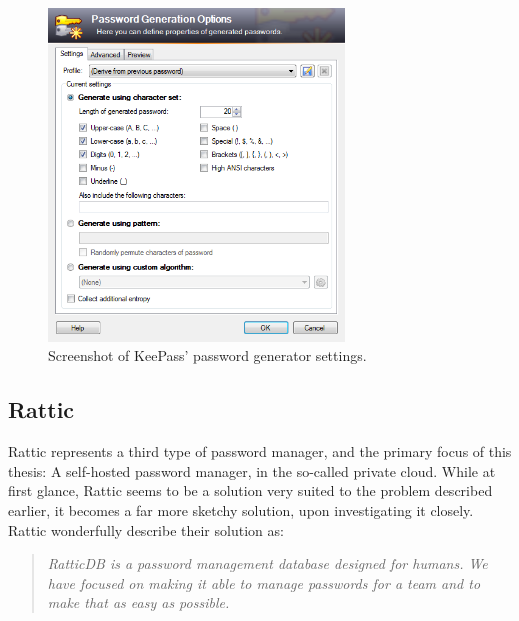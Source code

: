 
			\begin{figure}[h!]
				\centering
				\includegraphics[width=0.7\textwidth]{figures/analysis/keepass_newpassword_passwordgen.png}
				\caption{Screenshot of KeePass' password generator settings.}
				\label{fig:keepass_newpassword_passwordgen}
			\end{figure}

		\subsection*{Rattic}
			Rattic\cite{rattic_frontpage} represents a third type of password manager, and the primary focus of this thesis: A self-hosted password manager, in the so-called private cloud. While at first glance, Rattic seems to be a solution very suited to the problem described earlier, it becomes a far more sketchy solution, upon investigating it closely. Rattic wonderfully describe their solution as:

			\begin{quote}
				\emph{RatticDB is a password management database designed for humans. We have focused on making it able to manage passwords for a team and to make that as easy as possible.}\\\cite{rattic_frontpage}
			\end{quote}

